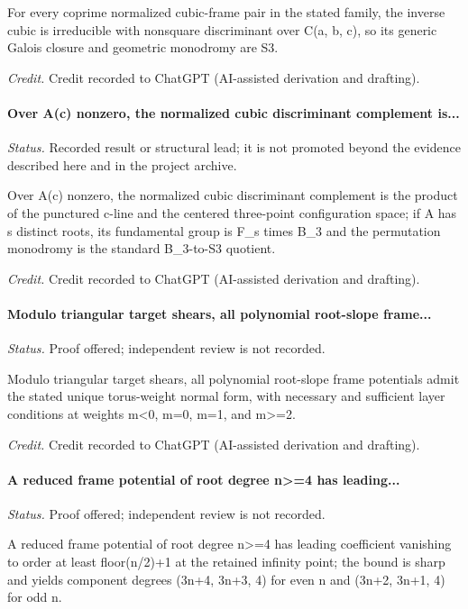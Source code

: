 For every coprime normalized cubic-frame pair in the stated family, the inverse cubic is irreducible with nonsquare discriminant over C(a, b, c), so its generic Galois closure and geometric monodromy are S3.

\emph{Credit.} Credit recorded to ChatGPT (AI-assisted derivation and drafting).

\label{supp-note-01-028}
\paragraph{Over A(c) nonzero, the normalized cubic discriminant complement is...}
\emph{Status.} Recorded result or structural lead; it is not promoted beyond the evidence described here and in the project archive.

Over A(c) nonzero, the normalized cubic discriminant complement is the product of the punctured c-line and the centered three-point configuration space; if A has s distinct roots, its fundamental group is F\_s times B\_3 and the permutation monodromy is the standard B\_3-to-S3 quotient.

\emph{Credit.} Credit recorded to ChatGPT (AI-assisted derivation and drafting).

\label{supp-note-01-029}
\paragraph{Modulo triangular target shears, all polynomial root-slope frame...}
\emph{Status.} Proof offered; independent review is not recorded.

Modulo triangular target shears, all polynomial root-slope frame potentials admit the stated unique torus-weight normal form, with necessary and sufficient layer conditions at weights m<0, m=0, m=1, and m>=2.

\emph{Credit.} Credit recorded to ChatGPT (AI-assisted derivation and drafting).

\label{supp-note-01-030}
\paragraph{A reduced frame potential of root degree n>=4 has leading...}
\emph{Status.} Proof offered; independent review is not recorded.

A reduced frame potential of root degree n>=4 has leading coefficient vanishing to order at least floor(n/2)+1 at the retained infinity point; the bound is sharp and yields component degrees (3n+4, 3n+3, 4) for even n and (3n+2, 3n+1, 4) for odd n.

